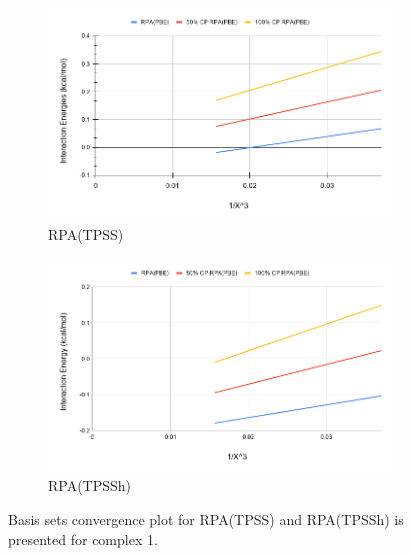 \documentclass[11pt]{article}
\begin{document}
\begin{figure}[hbpt]
  \centering
  \begin{subfigure}{\textwidth}
    \center
    \includegraphics[scale=0.45]{tpss_1.png}
    \caption{RPA(TPSS)}
    \label{fig:tpss_1}
  \end{subfigure}
  \begin{subfigure}{\textwidth}
    \center
    \includegraphics[scale=0.45]{tpssh_1.png}
    \caption{RPA(TPSSh)}
    \label{fig:tpssh_1}
  \end{subfigure}
  \caption{Basis sets convergence plot for RPA(TPSS)
    and RPA(TPSSh) is presented for complex 1.}
  \label{fig:complex_1}
\end{figure}
\end{document}
